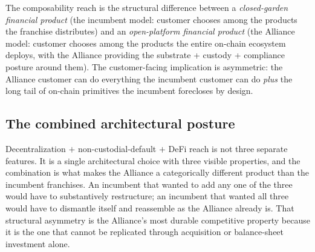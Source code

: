 The composability reach is the structural difference between a
\emph{closed-garden financial product} (the incumbent model: customer
chooses among the products the franchise distributes) and an
\emph{open-platform financial product} (the Alliance model: customer
chooses among the products the entire on-chain ecosystem deploys, with
the Alliance providing the substrate + custody + compliance posture
around them). The customer-facing implication is asymmetric: the
Alliance customer can do everything the incumbent customer can do
\emph{plus} the long tail of on-chain primitives the incumbent
forecloses by design.

\subsection{The combined architectural posture}

Decentralization $+$ non-custodial-default $+$ DeFi reach is not three
separate features. It is a single architectural choice with three
visible properties, and the combination is what makes the Alliance a
categorically different product than the incumbent franchises. An
incumbent that wanted to add any one of the three would have to
substantively restructure; an incumbent that wanted all three would
have to dismantle itself and reassemble as the Alliance already is.
That structural asymmetry is the Alliance's most durable competitive
property because it is the one that cannot be replicated through
acquisition or balance-sheet investment alone.
